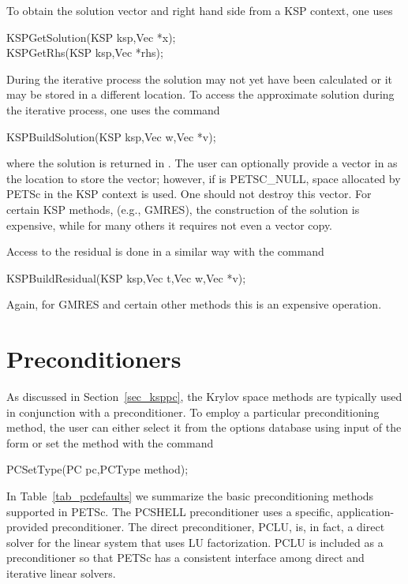 To obtain the solution vector and right hand side from a KSP
context, one uses
\begin{tabbing}
  KSPGetSolution(KSP ksp,Vec *x);\\
  KSPGetRhs(KSP ksp,Vec *rhs);
\end{tabbing}
During the iterative process
the solution may not yet have been calculated or it may be stored in
a different location. To access the approximate solution during the
iterative process, one uses the command
\begin{tabbing}
  KSPBuildSolution(KSP ksp,Vec w,Vec *v);
\end{tabbing}
where the solution is returned in . The user can optionally provide
a vector in  as the location to store the vector; however, if
 is PETSC\_NULL, space allocated by PETSc in the KSP context is
used. One should not destroy this vector. For certain KSP methods,
(e.g., GMRES), the construction of the solution is expensive, while for many
others it requires not even a vector copy.

Access to the residual is done in a similar way with the
command
\begin{tabbing}
  KSPBuildResidual(KSP ksp,Vec t,Vec w,Vec *v);
\end{tabbing}
Again, for GMRES and certain other methods this is an expensive
operation.

\section{Preconditioners} 
\label{sec_pc}

As discussed in Section~\ref{sec_ksppc}, the Krylov space methods are
typically used in conjunction with a preconditioner.
To employ a particular preconditioning method, the user can either select
it from the options database using input of the form
 or set the method with the
command 
\begin{tabbing}
  PCSetType(PC pc,PCType method);
\end{tabbing}
In Table~\ref{tab_pcdefaults} we summarize the basic
preconditioning methods supported in PETSc.
The PCSHELL preconditioner uses a specific,
application-provided preconditioner.  The direct preconditioner, PCLU,
is, in fact, a direct solver for the linear system that uses LU
factorization. PCLU is included as a preconditioner so that PETSc has a
consistent interface among direct and iterative linear solvers.

